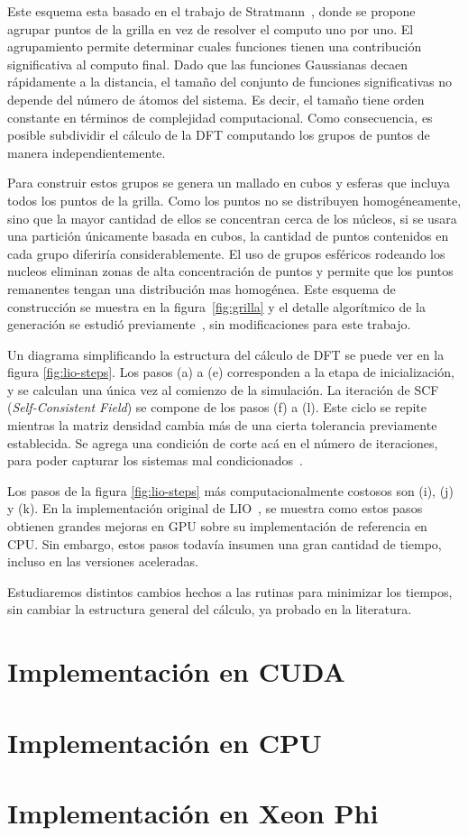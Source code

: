 Este esquema esta basado en el trabajo de Stratmann~\cite{Stratmann}, donde se propone
agrupar puntos de la grilla en vez de resolver el computo uno por uno. El agrupamiento permite determinar
cuales funciones tienen una contribuci\'on significativa al computo final. Dado que las
funciones Gaussianas decaen r\'apidamente a la distancia, el tama\~no del conjunto de
funciones significativas no depende del n\'umero de \'atomos del sistema. Es decir, el tama\~no
tiene orden constante en t\'erminos de complejidad computacional. Como consecuencia, es posible
subdividir el c\'alculo de la DFT computando los grupos de puntos de manera independientemente.

Para construir estos grupos se genera un mallado en cubos y esferas que incluya todos los puntos
de la grilla. Como los puntos no se distribuyen homog\'eneamente, sino que la mayor cantidad de ellos
se concentran cerca de los n\'ucleos, si se usara una partici\'on \'unicamente basada en cubos, la cantidad
de puntos contenidos en cada grupo diferir\'ia considerablemente. El uso de grupos esf\'ericos rodeando
los nucleos eliminan zonas de alta concentraci\'on de puntos y permite que los puntos remanentes
tengan una distribuci\'on mas homog\'enea. Este esquema de construcci\'on se muestra en la figura~\ref{fig:grilla}
y el detalle algor\'itmico de la generaci\'on se estudi\'o previamente~\cite{Nitsche2014,TesisNitsche},
sin modificaciones para este trabajo.

Un diagrama simplificando la estructura del c\'alculo de DFT se puede ver en la figura \ref{fig:lio-steps}.
Los pasos (a) a (e) corresponden a la etapa de inicializaci\'on, y se calculan una \'unica vez
al comienzo de la simulaci\'on. La iteraci\'on de SCF (\textit{Self-Consistent Field}) se
compone de los pasos (f) a (l). Este ciclo se repite mientras la matriz densidad cambia
m\'as de una cierta tolerancia previamente establecida. Se agrega una condici\'on de corte ac\'a
en el n\'umero de iteraciones, para poder capturar los sistemas mal condicionados~\cite{Nitsche2014}.

Los pasos de la figura \ref{fig:lio-steps} m\'as computacionalmente costosos son (i), (j) y (k).
En la implementaci\'on original de LIO~\cite{TesisNitsche}, se muestra como estos pasos
obtienen grandes mejoras en GPU sobre su implementaci\'on de referencia en CPU. Sin embargo,
estos pasos todav\'ia insumen una gran cantidad de tiempo, incluso en las versiones aceleradas.

Estudiaremos distintos cambios hechos a las rutinas para minimizar los tiempos,
sin cambiar la estructura general del c\'alculo, ya probado en la literatura.

\section{Implementaci\'on en CUDA}



\section{Implementaci\'on en CPU}



\section{Implementaci\'on en Xeon Phi}


